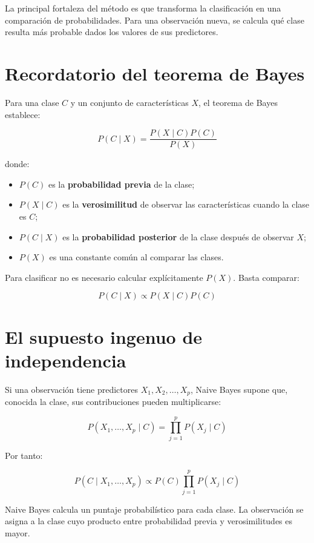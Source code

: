 \documentclass[
  spanish,
  10.5pt,
  letterpaper,
  openany,
  headings=big]{scrbook}
\providecommand{\tightlist}{%
  \setlength{\itemsep}{0pt}\setlength{\parskip}{0pt}}
\begin{document}
La principal fortaleza del método es que transforma la clasificación en
una comparación de probabilidades. Para una observación nueva, se
calcula qué clase resulta más probable dados los valores de sus
predictores.

\section{Recordatorio del teorema de
Bayes}\label{recordatorio-del-teorema-de-bayes}

Para una clase \(C\) y un conjunto de características \(X\), el teorema
de Bayes establece:

\[
P(C\mid X)=\frac{P(X\mid C)P(C)}{P(X)}
\]

donde:

\begin{itemize}
\tightlist
\item
  \(P(C)\) es la \textbf{probabilidad previa} de la clase;
\item
  \(P(X\mid C)\) es la \textbf{verosimilitud} de observar las
  características cuando la clase es \(C\);
\item
  \(P(C\mid X)\) es la \textbf{probabilidad posterior} de la clase
  después de observar \(X\);
\item
  \(P(X)\) es una constante común al comparar las clases.
\end{itemize}

Para clasificar no es necesario calcular explícitamente \(P(X)\). Basta
comparar:

\[
P(C\mid X)\propto P(X\mid C)P(C)
\]

\section{El supuesto ingenuo de
independencia}\label{el-supuesto-ingenuo-de-independencia}

Si una observación tiene predictores \(X_1,X_2,\ldots,X_p\), Naive Bayes
supone que, conocida la clase, sus contribuciones pueden multiplicarse:

\[
P(X_1,\ldots,X_p\mid C)
=\prod_{j=1}^{p}P(X_j\mid C)
\]

Por tanto:

\[
P(C\mid X_1,\ldots,X_p)
\propto P(C)\prod_{j=1}^{p}P(X_j\mid C)
\]

\begin{tcolorbox}[enhanced jigsaw, arc=.35mm, bottomrule=.15mm, bottomtitle=1mm, breakable, colback=white, colbacktitle=quarto-callout-tip-color!10!white, colframe=quarto-callout-tip-color-frame, coltitle=black, left=2mm, leftrule=.75mm, opacityback=0, opacitybacktitle=0.6, rightrule=.15mm, title=\textcolor{quarto-callout-tip-color}{\faLightbulb}\hspace{0.5em}{Idea esencial}, titlerule=0mm, toprule=.15mm, toptitle=1mm]

Naive Bayes calcula un puntaje probabilístico para cada clase. La
observación se asigna a la clase cuyo producto entre probabilidad previa
y verosimilitudes es mayor.

\end{tcolorbox}
\end{document}
